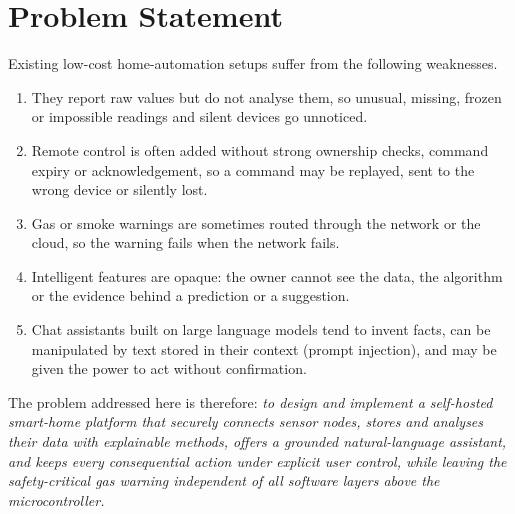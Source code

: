 \documentclass[12pt,a4paper,oneside]{report}
\begin{document}
\section{Problem Statement}
Existing low-cost home-automation setups suffer from the following weaknesses.
\begin{enumerate}
  \item They report raw values but do not analyse them, so unusual, missing, frozen or impossible readings and silent devices go unnoticed.
  \item Remote control is often added without strong ownership checks, command expiry or acknowledgement, so a command may be replayed, sent to the wrong device or silently lost.
  \item Gas or smoke warnings are sometimes routed through the network or the cloud, so the warning fails when the network fails.
  \item Intelligent features are opaque: the owner cannot see the data, the algorithm or the evidence behind a prediction or a suggestion.
  \item Chat assistants built on large language models tend to invent facts, can be manipulated by text stored in their context (prompt injection), and may be given the power to act without confirmation.
\end{enumerate}

The problem addressed here is therefore: \emph{to design and implement a self-hosted smart-home platform that securely connects sensor nodes, stores and analyses their data with explainable methods, offers a grounded natural-language assistant, and keeps every consequential action under explicit user control, while leaving the safety-critical gas warning independent of all software layers above the microcontroller.}
\end{document}
